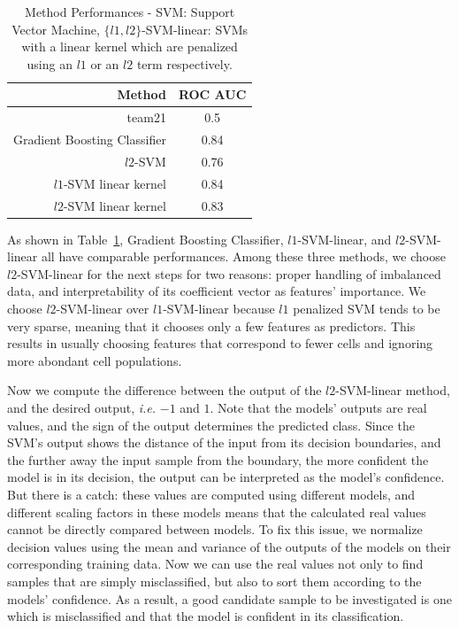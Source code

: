 \begin{table}[!ht]
  \centering
  \begin{tabular}{rc}
    Method & ROC AUC \\ \hline
    team21 & 0.5  \\
    Gradient Boosting Classifier & 0.84  \\
    $l2$-SVM & 0.76 \\
    $l1$-SVM linear kernel & 0.84  \\
    $l2$-SVM linear kernel & 0.83
  \end{tabular}
  \caption{Method Performances - SVM: Support Vector Machine, $\{l1, l2\}$-SVM-linear: SVMs with a linear kernel which are penalized using an $l1$ or an $l2$ term respectively.}
  \label{tbl:fcs-qa-performances}
\end{table}

As shown in Table~\ref{tbl:fcs-qa-performances}, Gradient Boosting Classifier, $l1$-SVM-linear, and $l2$-SVM-linear all have comparable performances. Among these three methods, we choose $l2$-SVM-linear for the next steps for two reasons: proper handling of imbalanced data, and interpretability of its coefficient vector as features' importance. We choose $l2$-SVM-linear over $l1$-SVM-linear because $l1$ penalized SVM tends to be very sparse, meaning that it chooses only a few features as predictors. This results in usually choosing features that correspond to fewer cells and ignoring more abondant cell populations.

Now we compute the difference between the output of the $l2$-SVM-linear method, and the desired output, \emph{i.e.} $-1$ and $1$. Note that the models' outputs are real values, and the sign of the output determines the predicted class. Since the SVM's output shows the distance of the input from its decision boundaries, and the further away the input sample from the boundary, the more confident the model is in its decision, the output can be interpreted as the model's confidence. But there is a catch: these values are computed using different models, and different scaling factors in these models means that the calculated real values cannot be directly compared between models. To fix this issue, we normalize decision values using the mean and variance of the outputs of the models on their corresponding training data. Now we can use the real values not only to find samples that are simply misclassified, but also to sort them according to the models' confidence. As a result, a good candidate sample to be investigated is one which is misclassified and that the model is confident in its classification. 

